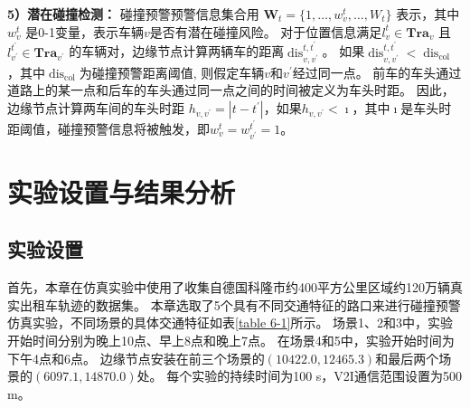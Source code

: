\textbf{5）潜在碰撞检测：}
碰撞预警预警信息集合用 $\mathbf{W}_t = \{ 1, \ldots, w_{v}^{t}, \ldots, W_t\}$ 表示，其中 $w_{v}^{t}$ 是0-1变量，表示车辆$v$是否有潜在碰撞风险。
对于位置信息满足$l_v^t \in \mathbf{Tra}_{v}$ 且 $l_{v^{\prime}}^{t^{\prime}} \in \mathbf{Tra}_{v^{\prime}}$ 的车辆对，边缘节点计算两辆车的距离$\operatorname{dis}_{v, v^{\prime}}^{t, t^{\prime}}$。
如果$\operatorname{dis}_{v, v^{\prime}}^{t, t^{\prime}} < \operatorname{dis}_{\operatorname{col}}$，其中$\operatorname{dis}_{\operatorname{col}}$为碰撞预警距离阈值, 则假定车辆$v$和$v^{\prime}$经过同一点。
前车的车头通过道路上的某一点和后车的车头通过同一点之间的时间被定义为车头时距\cite{vogel2003comparison}。
因此，边缘节点计算两车间的车头时距 ${h}_{v, v^{\prime}} = |t - t^{\prime}|$，如果${h}_{v, v^{\prime}} < \imath$，其中$\imath$是车头时距阈值，碰撞预警信息将被触发，即$w_{v}^{t} = w_{v^{\prime}}^{t^{\prime}} = 1$。

\section[\hspace{-2pt}实验设置与结果分析]{{ \hspace{-8pt}实验设置与结果分析}}\label{section 5-4}

\subsection[\hspace{-2pt}实验设置]{{ \hspace{-8pt}实验设置}}

首先，本章在仿真实验中使用了收集自德国科隆市约400平方公里区域约120万辆真实出租车轨迹的数据集\cite{uppoor2013generation}。
本章选取了5个具有不同交通特征的路口来进行碰撞预警仿真实验，不同场景的具体交通特征如表\ref{table 6-1}所示。
场景1、2和3中，实验开始时间分别为晚上10点、早上8点和晚上7点。
在场景4和5中，实验开始时间为下午4点和6点。
边缘节点安装在前三个场景的$(10422.0, 12465.3)$和最后两个场景的$(6097.1, 14870.0)$处。
每个实验的持续时间为100 s，V2I通信范围设置为500 m。

\begin{table}[h]\small
{} %
\centering
{}
\label{table 6-1}
\end{table}

